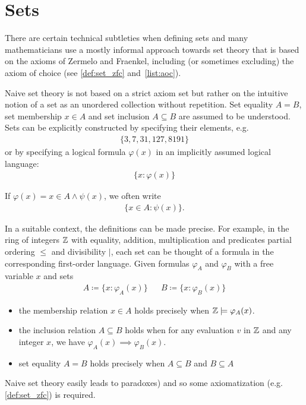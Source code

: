 \section{Sets}\label{sec:sets}

There are certain technical subtleties when defining sets and many mathematicians use a mostly informal approach towards set theory that is based on the axioms of Zermelo and Fraenkel, including (or sometimes excluding) the axiom of choice (see \ref{def:set_zfc} and~\cref{list:aoc}).

\begin{definition}\label{def:set_naive}\cite[Chapter 1]{Enderton1997}
  Naive set theory is not based on a strict axiom set but rather on the intuitive notion of a set as an unordered collection without repetition. Set equality $A = B$, set membership $x \in A$ and set inclusion $A \subseteq B$ are assumed to be understood. Sets can be explicitly constructed by specifying their elements, e.g.
  \begin{align*}
    \{ 3, 7, 31, 127, 8191 \}
  \end{align*}
  or by specifying a logical formula $\varphi(x)$ in an implicitly assumed logical language:
  \begin{align*}
    \{ x \colon \varphi(x) \}
  \end{align*}

  If $\varphi(x) = x \in A \land \psi(x)$, we often write
  \begin{align*}
    \{ x \in A \colon \psi(x) \}.
  \end{align*}

  In a suitable context, the definitions can be made precise. For example, in the ring of integers $\mathbb Z$ with equality, addition, multiplication and predicates partial ordering $\leq$ and divisibility $\vert$, each set can be thought of a formula in the corresponding first-order language. Given formulas $\varphi_A$ and $\varphi_B$ with a free variable $x$ and sets
  \begin{align*}
    A \coloneqq \{ x \colon \varphi_A(x) \} && B \coloneqq \{ x \colon \varphi_B(x) \}
  \end{align*}

  \begin{itemize}
    \item the membership relation $x \in A$ holds precisely when $\mathbb Z \models \varphi_A(x)$.

    \item the inclusion relation $A \subseteq B$ holds when for any evaluation $v$ in $\mathbb Z$ and any integer $x$, we have $\varphi_A(x) \implies \varphi_B(x)$.

    \item set equality $A = B$ holds precisely when $A \subseteq B$ and $B \subseteq A$
  \end{itemize}

  Naive set theory easily leads to paradoxes) and so some axiomatization (e.g. \cref{def:set_zfc}) is required.
\end{definition}

